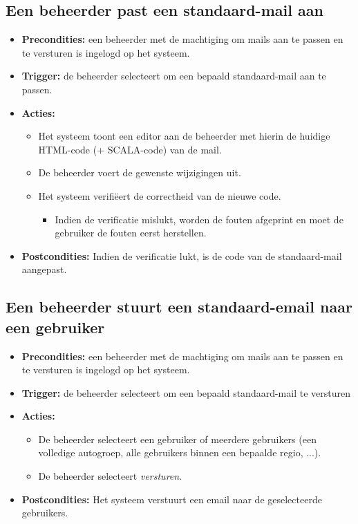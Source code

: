 \documentclass[]{article}
\begin{document}
\subsection{Een beheerder past een standaard-mail aan}
\begin{itemize}
\item \textbf{Precondities:} een beheerder met de machtiging om mails aan te passen en te versturen is ingelogd op het systeem.
\item \textbf{Trigger:} de beheerder selecteert om een bepaald standaard-mail aan te passen.
\item \textbf{Acties:} 
\begin{itemize}
	\item	Het systeem toont een editor aan de beheerder met hierin de huidige HTML-code (+ SCALA-code) van de mail.
	\item	De beheerder voert de gewenste wijzigingen uit.
	\item	Het systeem verifi\"{e}ert de correctheid van de nieuwe code.
		\begin{itemize}
			\item Indien de verificatie mislukt, worden de fouten afgeprint en moet de gebruiker de fouten eerst herstellen.
		\end{itemize}
\end{itemize}
\item \textbf{Postcondities:} Indien de verificatie lukt, is de code van de standaard-mail aangepast.
\end{itemize}

\subsection{Een beheerder stuurt een standaard-email naar een gebruiker}
\begin{itemize}
\item \textbf{Precondities:} een beheerder met de machtiging om mails aan te passen en te versturen is ingelogd op het systeem.
\item \textbf{Trigger:} de beheerder selecteert om een bepaald standaard-mail te versturen
\item \textbf{Acties:} 
\begin{itemize}
	\item	De beheerder selecteert een gebruiker of meerdere gebruikers (een volledige autogroep, alle gebruikers binnen een bepaalde regio, ...).
	\item	De beheerder selecteert \emph{versturen}.
\end{itemize}
\item \textbf{Postcondities:} Het systeem verstuurt een email naar de geselecteerde gebruikers.
\end{itemize}
\end{document}
